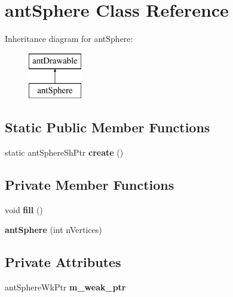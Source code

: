 \hypertarget{classant_sphere}{\section{ant\+Sphere Class Reference}
\label{classant_sphere}
}
Inheritance diagram for ant\+Sphere\+:\begin{figure}[H]
\begin{center}
\leavevmode
\includegraphics[height=2.000000cm]{classant_sphere}
\end{center}
\end{figure}
\subsection*{Static Public Member Functions}
\begin{DoxyCompactItemize}
\item 
\hypertarget{classant_sphere_a5808ec82771a99494c69bb674f73f7f9}{static ant\+Sphere\+Sh\+Ptr {\bfseries create} ()}\label{classant_sphere_a5808ec82771a99494c69bb674f73f7f9}

\end{DoxyCompactItemize}
\subsection*{Private Member Functions}
\begin{DoxyCompactItemize}
\item 
\hypertarget{classant_sphere_adb2cfd74c195ceb9c6c0a0274c170bc8}{void {\bfseries fill} ()}\label{classant_sphere_adb2cfd74c195ceb9c6c0a0274c170bc8}

\item 
\hypertarget{classant_sphere_a6dd3b41d2fe037bdb6b406abc29a28fc}{{\bfseries ant\+Sphere} (int n\+Vertices)}\label{classant_sphere_a6dd3b41d2fe037bdb6b406abc29a28fc}

\end{DoxyCompactItemize}
\subsection*{Private Attributes}
\begin{DoxyCompactItemize}
\item 
\hypertarget{classant_sphere_ad1891361ec747beaf4c333c8b5d9ec1f}{ant\+Sphere\+Wk\+Ptr {\bfseries m\+\_\+weak\+\_\+ptr}}\label{classant_sphere_ad1891361ec747beaf4c333c8b5d9ec1f}

\end{DoxyCompactItemize}
